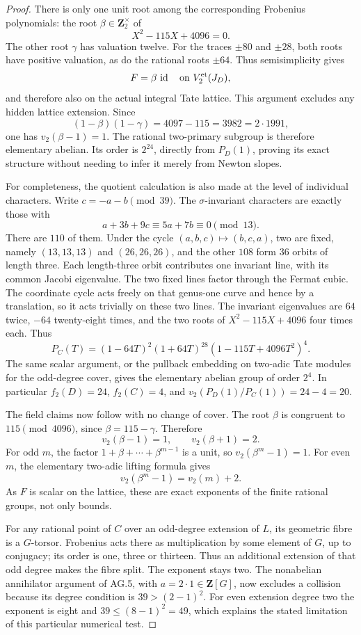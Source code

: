 \begin{proof}
There is only one unit root among the corresponding
Frobenius polynomials: the root \(\beta\in\mathbf Z_2^\times\) of
\[
                       X^2-115X+4096=0.
\]
The other root \(\gamma\) has valuation twelve.
For the traces \(\pm80\) and \(\pm28\), both roots
have positive valuation, as do the rational roots
\(\pm64\). Thus semisimplicity gives
\[
               F=\beta\,\operatorname{id}
               \quad\text{on }V_2^{\rm et}(J_D),
\]
and therefore also on the actual integral Tate lattice.
This argument excludes any hidden lattice extension.
Since
\[
 (1-\beta)(1-\gamma)=4097-115=3982=2\cdot1991,
\]
one has \(v_2(\beta-1)=1\). The rational two-primary
subgroup is therefore elementary abelian. Its order is
\(2^{24}\), directly from \(P_D(1)\), proving its exact
structure without needing to infer it merely from
Newton slopes.

For completeness, the quotient calculation is also made
at the level of individual characters. Write
\(c=-a-b\pmod{39}\). The \(\sigma\)-invariant characters
are exactly those with
\[
                    a+3b+9c\equiv5a+7b\equiv0\pmod{13}.
\]
There are \(110\) of them. Under the cycle
\((a,b,c)\mapsto(b,c,a)\), two are fixed,
namely \((13,13,13)\) and \((26,26,26)\), and the
other \(108\) form \(36\) orbits of length three.
Each length-three orbit contributes one invariant line,
with its common Jacobi eigenvalue. The two fixed lines
factor through the Fermat cubic. The coordinate cycle
acts freely on that genus-one curve and hence by a
translation, so it acts trivially on these two lines.
The invariant eigenvalues are \(64\) twice, \(-64\)
twenty-eight times, and the two roots of
\(X^2-115X+4096\) four times each. Thus
\[
        P_C(T)=(1-64T)^2(1+64T)^{28}
                           (1-115T+4096T^2)^4.
\]
The same scalar argument, or the pullback embedding
on two-adic Tate modules for the odd-degree cover,
gives the elementary abelian group of order \(2^4\).
In particular \(f_2(D)=24\), \(f_2(C)=4\), and
\(v_2(P_D(1)/P_C(1))=24-4=20\).

The field claims now follow with no change of cover.
The root \(\beta\) is congruent to \(115\pmod{4096}\),
since \(\beta=115-\gamma\). Therefore
\[
                   v_2(\beta-1)=1,\qquad
                   v_2(\beta+1)=2.
\]
For odd \(m\), the factor
\(1+\beta+\cdots+\beta^{m-1}\) is a unit, so
\(v_2(\beta^m-1)=1\). For even \(m\), the elementary
two-adic lifting formula gives
\[
                  v_2(\beta^m-1)=v_2(m)+2.
\]
As \(F\) is scalar on the lattice, these are exact
exponents of the finite rational groups, not only bounds.

For any rational point of \(C\) over an odd-degree
extension of \(L\), its geometric fibre is a \(G\)-torsor.
Frobenius acts there as multiplication by some element
of \(G\), up to conjugacy; its order is one, three or
thirteen. Thus an additional extension of that odd
degree makes the fibre split. The exponent stays two.
The nonabelian annihilator argument of AG.5, with
\(a=2\cdot1\in\mathbf Z[G]\), now excludes a collision
because its degree condition is \(39>(2-1)^2\).
For even extension degree two the exponent is eight
and \(39\le(8-1)^2=49\), which explains the stated
limitation of this particular numerical test.
\end{proof}

